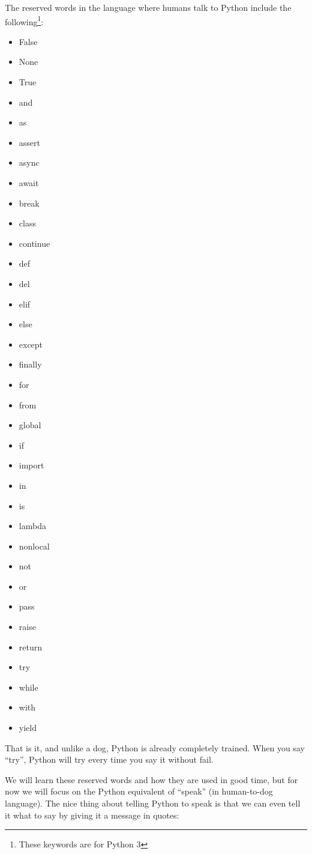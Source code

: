 The reserved words in the language where humans talk to 
Python include the following\footnote{These keywords are for Python 3}:
\begin{multicols}{4}
\raggedcolumns
\begin{itemize}[label={}]
\item False
\item None
\item True
\item and
\item as
\item assert
\item async
\item await
\item break
\item class
\item continue
\item def
\item del
\item elif
\item else
\item except
\item finally
\item for
\item from
\item global
\item if
\item import
\item in
\item is
\item lambda
\item nonlocal
\item not
\item or
\item pass
\item raise
\item return
\item try
\item while
\item with
\item yield
\end{itemize}
\end{multicols}

%
That is it, and unlike a dog, Python is already completely trained.
When you say ``try'', Python will try every time you say it without
fail.

We will learn these reserved words and how they are used in good time,
but for now we will focus on the Python equivalent of ``speak'' (in 
human-to-dog language).  The nice thing about telling Python to speak
is that we can even tell it what to say by giving it a message in quotes:

